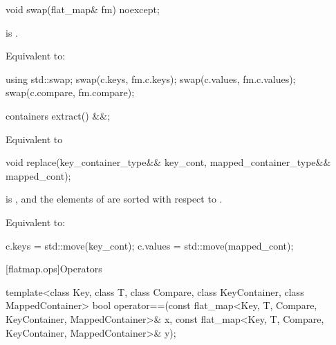 \begin{codeblock}
\begin{codeblock}
\begin{codeblock}
\begin{addedblock}
%
\begin{itemdecl}
void swap(flat_map& fm) noexcept;
\end{itemdecl}

\begin{itemdescr}
\pnum \constraints {} is .

\pnum \effects Equivalent to:
\begin{codeblock}
using std::swap;
swap(c.keys, fm.c.keys);
swap(c.values, fm.c.values);
swap(c.compare, fm.compare);
\end{codeblock}
\end{itemdescr}

%
\begin{itemdecl}
containers extract() &&;
\end{itemdecl}

\begin{itemdescr}
\effects Equivalent to 
\end{itemdescr}

%
\begin{itemdecl}
void replace(key_container_type&& key_cont, mapped_container_type&& mapped_cont);
\end{itemdecl}

\begin{itemdescr}
\pnum \expects
{} is , and the elements of
 are sorted with respect to .

\pnum
\effects Equivalent to:
\begin{codeblock}
c.keys = std::move(key_cont);
c.values = std::move(mapped_cont);
\end{codeblock}
\end{itemdescr}

[flatmap.ops]{Operators}

%
\begin{itemdecl}
template<class Key, class T, class Compare, class KeyContainer, class MappedContainer>
  bool operator==(const flat_map<Key, T, Compare, KeyContainer, MappedContainer>& x,
                  const flat_map<Key, T, Compare, KeyContainer, MappedContainer>& y);
\end{itemdecl}


\end{addedblock}
\end{codeblock}
\end{codeblock}
\end{codeblock}
